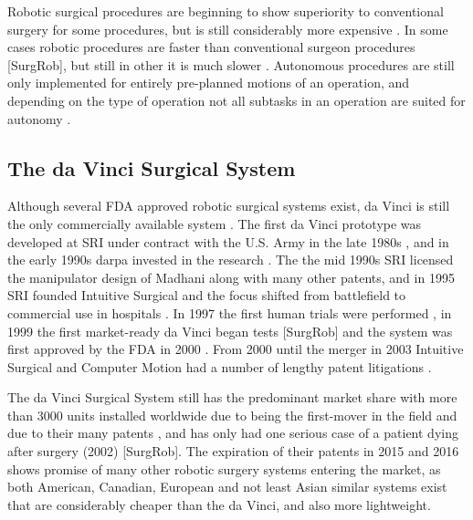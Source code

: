 Robotic surgical procedures are beginning to show superiority to conventional surgery for some procedures, but is still considerably more expensive \citep{bib:docatadist}. In some cases robotic procedures are faster than conventional surgeon procedures [SurgRob], but still in other it is much slower \citep{bib:raven_ii,bib:raven_debride}.
Autonomous procedures are still only implemented for entirely pre-planned motions of an operation, and depending on the type of operation not all subtasks in an operation are suited for autonomy \citep{bib:raven_debride,bib:raven_ii}.





\subsection{The da Vinci Surgical System}
Although several FDA approved robotic surgical systems exist, da Vinci is still the only commercially available system \citep{bib:docatadist,bib:intuitive_monopoly}. The first da Vinci prototype was developed at SRI under contract with the U.S. Army in the late 1980s \citep{bib:mddi,bib:brown_univ}, and in the early 1990s \gls{darpa} invested in the research \citep[p 74]{bib:surgical_book}. The the mid 1990s SRI licensed the manipulator design of Madhani along with many other patents, and in 1995 SRI founded Intuitive Surgical and the focus shifted from battlefield to commercial use in hospitals \citep{bib:intuitive_monopoly}.
In 1997 the first human trials were performed \citep{bib:intuitive_monopoly}, in 1999 the first market-ready da Vinci began tests [SurgRob] and the system was first approved by the FDA in 2000 \citep{bib:intuitive_monopoly,bib:brown_univ}. From 2000 until the merger in 2003 Intuitive Surgical and Computer Motion had a number of lengthy patent litigations \citep{bib:intuitive_monopoly,bib:telesurg_history}.

The da Vinci Surgical System still has the predominant market share with more than 3000 units installed worldwide due to being the first-mover in the field and due to their many patents \citep{bib:intuitive_monopoly}, and has only had one serious case of a patient dying after surgery (2002) [SurgRob].
The expiration of their patents in 2015 and 2016 \citep{bib:intuitive_monopoly} shows promise of many other robotic surgery systems entering the market, as both American, Canadian, European and not least Asian similar systems exist that are considerably cheaper than the da Vinci, and also more lightweight.


